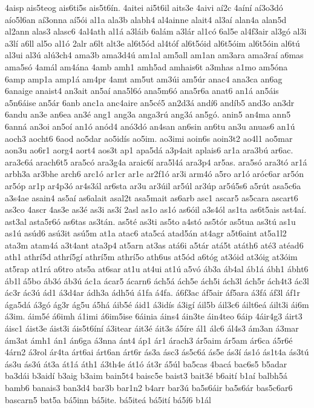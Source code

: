 {4aisp
ais5teog
ais6ti5s
ais5t6ín.
4aitei
ai5t6il
aits3e
4aivi
aí2c
4aíní
aí3o3dó
aío5l6an
aí3onna
aí5ói
al1a
ala3b
alabh4
al4ainne
alait4
al3aí
alan4a
alan5d
al2ann
alas3
alasc6
4al4ath
al1á
a3láib
6alám
a3lár
al1có
6al5e
al4f3air
al3gó
al3i
a3lí
a6ll
al5o
al1ó
2alr
a6lt
alt3e
al6t5ód
al4tóf
al6t5óid
al6t5óim
al6t5óin
al6tú
al3ui
al3ú
alú3ch4
ama3b
ama3d4ú
am1al
am5all
am1an
am3ara
ama3raí
a6mas
ama5só
4amál
am4ána
4amb
amh1
amh5ad
amhais6t
a3mhas
a1mo
am5óna
6amp
amp1a
amp1á
am4pr
4amt
am5ut
am3úi
am5úr
anac4
ana3ca
an6ag
6anaige
anaist4
an3ait
an5aí
ana5l6ó
ana5m6ó
ana5r6a
anat6
an1á
an5áis
a5n6áise
an5ár
6anb
anc1a
anc4aire
an5cé5
an2d3á
andí6
andíb5
and3o
an3dr
6andu
an3e
an6ea
an3é
ang1
ang3a
anga3rú
ang3á
an5gó.
anin5
an4ma
ann5
6anná
an3oi
an5oí
an1ó
anód4
anó3dó
an4san
an6sin
an6tu
an3u
anuas6
an1ú
aoch3
aocht6
6aod
ao5dar
ao5idís
ao5im.
ao3imi
aoin6s
aoin3t2
ao4l1
ao5mar
aon3u
ao6r1
aorg4
aort4
aos3t
ap1
apa5dá
a3p4ait
aplais6
ar1a
ara3bú
ar6ac.
ara3c6á
arach6t5
ara5có
ara3g4a
araic6í
ara5l4á
ara3p4
ar5as.
ara5só
ara3tó
ar1á
arbh3a
ar3bhe
arch6
arc1ó
ar1cr
ar1e
ar2f1ó
ar3i
arm4ó
a5ro
ar1ó
aróc6ar
ar5ón
ar5óp
ar1p
ar4p3ó
ar4s3ál
ar6sta
ar3u
ar3úil
ar5úl
ar3úp
ar5ú5s6
a5rút
asa5c6a
a3s4ae
asain4
as5aí
as6alait
asal2t
asa5mait
as6arb
asc1
ascar5
as5cara
ascart6
as3co
4ascr
4as3e
as3é
as3i
as3í
2asl
as1o
as1ó
as6óil
a3s4ól
as1ta
as6t5ais
ast4aí.
ast3al
asta5r6ó
as6tas
as3tán.
as5té
as3ti
as5to
a4stó
as5tór
as5tua
as3tú
as1u
as1ú
asúd6
asú3it
asú5m
at1a
atac6
ata5cá
atad5án
at4agr
a5t6aint
at5a1l2
ata3m
atam4á
a3t4ant
ata3p4
at5arn
at3as
atá6i
a5tár
atá5t
atáth6
até3
atéad6
ath1
athrí5d
athrí5gí
athrí5m
athrí5o
ath6us
at5ód
a6tóg
at3óid
at3óig
at3óim
at5rap
at1rá
a6tro
ats5a
at6sar
at1u
at4ui
at1ú
a5vó
áb3a
áb4al
áb1á
ábh1
ábht6
áb1l
á5bo
áb3ó
áb3ú
ác1a
ácar5
ácarn6
ách5á
ách5e
ách5i
ách3l
ách5r
ách4t3
ác3l
ác3r
ác3ú
ád1
á3d4ar
ádh3a
ádh5ú
á1fa
á4fa.
á6f3ac
áf5air
áf5ara
á3fá
áf3l
áf1r
ága5dá
á3gó
ág3r
ág5u
á5há
áib5é
áid1
á3idís
á3igí
áil5b
áil3c6
áilt6eá
áilt3i
ái6m
á3im.
áim5é
á6imh
á1imi
á6im5ise
6áinia
áins4
áin3te
áin4teo
6áip
4áir4g3
áirt3
áisc1
áist3e
áist3i
áis5t6íní
á3itear
áit3é
áit3s
á5íre
ál1
álc6
ál4s3
ám3an
á3mar
ám3at
ámh1
án1
án6ga
á3nna
ánt4
áp1
ár1
árach3
ár5aim
ár5am
ár6ca
á5r6é
4árn2
á3rol
ár4ta
árt6ai
árt6an
árt6r
ás3a
ásc3
ás5c6á
ás5e
ás3í
ás1ó
ás1t4a
ás3tú
ás3u
ás3ú
át3a
át1á
áth1
á3th4e
át1ó
át3r
á5úl
ba5cas
4bacá
bac6s5
b5adar
ba3dái
b3aidí
b3aig
b3aim
bain5t4
baisc5e
baist3
bait3é
b6aití
b1aí
balbh5á
bamb6
banais3
ban3d4
bar3b
bar1n2
b4arr
bar3ú
ba5s6áir
ba5s6ár
bas5c6ar6
bascarn5
bat5a
bá5inn
bá5ite.
bá5iteá
bá5ití
bá5í6
b1ál
}
